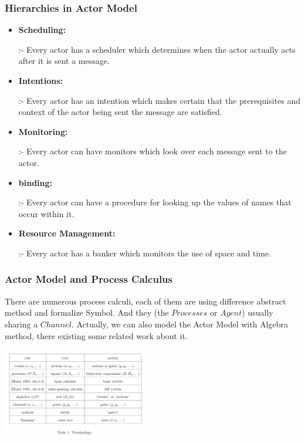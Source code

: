 \documentclass[notheorems, aspectratio=54]{beamer}
\begin{document}
\begin{frame}
  \frametitle{Hierarchies in Actor Model}
  \begin{itemize}
  \item {\bfseries Scheduling:}

    :- Every actor has a scheduler which determines when the actor actually acts after it is sent a message.
  \item {\bfseries Intentions:}

    :- Every actor has an intention which makes certain that the prerequisites and context of the actor being sent the message are satisfied.
  \item {\bfseries Monitoring:}

    :- Every actor can have monitors which look over each message sent to the actor.
  \item {\bfseries binding:}

    :- Every actor can have a procedure for looking up the values of names that occur within it.
  \item {\bfseries Resource Management:}

    :- Every actor has a banker which monitors the use of space and time.
  \end{itemize}
\end{frame}

\begin{frame}
  \frametitle{Actor Model and Process Calculus}
  There are numerous process calculi\cite{picalcu, historyofpi}, each of them are using difference abstract method and formalize Symbol. And they (the $Processes$ or $Agent$) usually sharing a $Channel$. Actually, we can also model the Actor Model with Algebra method, there existing some related work about it\cite{actoralgebra}.
  \begin{center}
    \includegraphics[height=4cm]{./pialgebra.png}
  \end{center}
\end{frame}
\end{document}
